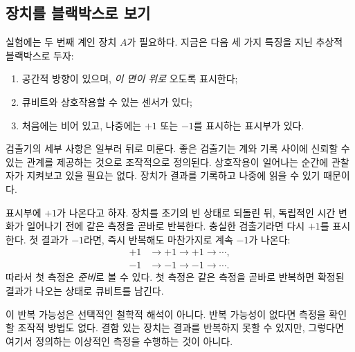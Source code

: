 \begin{classroomqa}
\end{classroomqa}

\subsection{장치를 블랙박스로 보기}

실험에는 두 번째 계인 장치 \(A\)가 필요하다. 지금은 다음 세 가지 특징을 지닌 추상적 블랙박스로 두자:
\begin{enumerate}
  \item 공간적 방향이 있으며, \emph{이 면이 위로} 오도록 표시한다;
  \item 큐비트와 상호작용할 수 있는 센서가 있다;
  \item 처음에는 비어 있고, 나중에는 \(+1\) 또는 \(-1\)를 표시하는 표시부가 있다.
\end{enumerate}
검출기의 세부 사항은 일부러 뒤로 미룬다. 좋은 검출기는 계와 기록 사이에 신뢰할 수 있는 관계를 제공하는 것으로 조작적으로 정의된다. 상호작용이 일어나는 순간에 관찰자가 지켜보고 있을 필요는 없다. 장치가 결과를 기록하고 나중에 읽을 수 있기 때문이다.

표시부에 \(+1\)가 나온다고 하자. 장치를 초기의 빈 상태로 되돌린 뒤, 독립적인 시간 변화가 일어나기 전에 같은 측정을 곧바로 반복한다. 충실한 검출기라면 다시 \(+1\)를 표시한다. 첫 결과가 \(-1\)라면, 즉시 반복해도 마찬가지로 계속 \(-1\)가 나온다:
\begin{equation}
\begin{aligned}
  +1&\longrightarrow +1\longrightarrow +1\longrightarrow\cdots,\\
  -1&\longrightarrow -1\longrightarrow -1\longrightarrow\cdots.
\end{aligned}
\end{equation}
따라서 첫 측정은 \emph{준비}로 볼 수 있다. 첫 측정은 같은 측정을 곧바로 반복하면 확정된 결과가 나오는 상태로 큐비트를 남긴다.

이 반복 가능성은 선택적인 철학적 해석이 아니다. 반복 가능성이 없다면 측정을 확인할 조작적 방법도 없다. 결함 있는 장치는 결과를 반복하지 못할 수 있지만, 그렇다면 여기서 정의하는 이상적인 측정을 수행하는 것이 아니다.

\begin{classroomqa}
\end{classroomqa}

